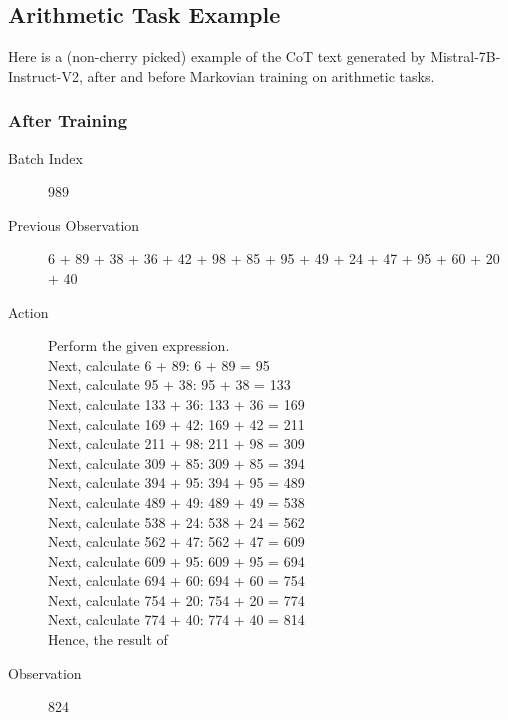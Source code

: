 \documentclass{article}
\begin{document}
\subsection{Arithmetic Task Example}
Here is a (non-cherry picked) example of the CoT text generated by Mistral-7B-Instruct-V2, after and before Markovian training on arithmetic tasks.

\subsubsection{After Training}
\begin{description}
    \item[Batch Index] 989
    \item[Previous Observation] 6 + 89 + 38 + 36 + 42 + 98 + 85 + 95 + 49 + 24 + 47 + 95 + 60 + 20 + 40
    \item[Action] Perform the given expression.\\[1ex]
    Next, calculate 6 + 89: 6 + 89 = 95\\[1ex]
    Next, calculate 95 + 38: 95 + 38 = 133\\[1ex]
    Next, calculate 133 + 36: 133 + 36 = 169\\[1ex]
    Next, calculate 169 + 42: 169 + 42 = 211\\[1ex]
    Next, calculate 211 + 98: 211 + 98 = 309\\[1ex]
    Next, calculate 309 + 85: 309 + 85 = 394\\[1ex]
    Next, calculate 394 + 95: 394 + 95 = 489\\[1ex]
    Next, calculate 489 + 49: 489 + 49 = 538\\[1ex]
    Next, calculate 538 + 24: 538 + 24 = 562\\[1ex]
    Next, calculate 562 + 47: 562 + 47 = 609\\[1ex]
    Next, calculate 609 + 95: 609 + 95 = 694\\[1ex]
    Next, calculate 694 + 60: 694 + 60 = 754\\[1ex]
    Next, calculate 754 + 20: 754 + 20 = 774\\[1ex]
    Next, calculate 774 + 40: 774 + 40 = 814\\[1ex]
    Hence, the result of
    \item[Observation] 824
\end{description}
\end{document}
